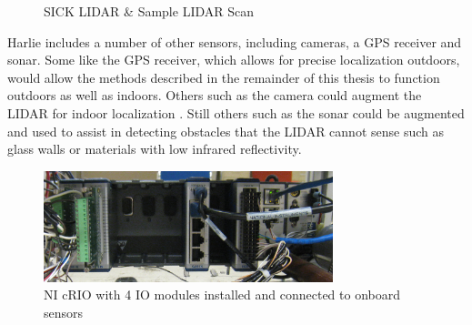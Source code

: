 \begin{figure}
\centering
{}
\hfill
{}
\caption{SICK LIDAR \& Sample LIDAR Scan}
\label{fig:sick_and_sample_scan}
\end{figure}

Harlie includes a number of other sensors, including cameras, a GPS receiver and sonar. Some like the GPS receiver, which allows for precise localization outdoors, would allow the methods described in the remainder of this thesis to function outdoors as well as indoors. Others such as the camera could augment the LIDAR for indoor localization \autocite{Harper2009}. Still others such as the sonar could be augmented and used to assist in detecting obstacles that the LIDAR cannot sense such as glass walls or materials with low infrared reflectivity.

\begin{figure}
\centering
\includegraphics[width=0.75\textwidth]{images/cRIO}
\caption{NI cRIO with 4 IO modules installed and connected to onboard sensors \label{fig:crio}}
\end{figure}

